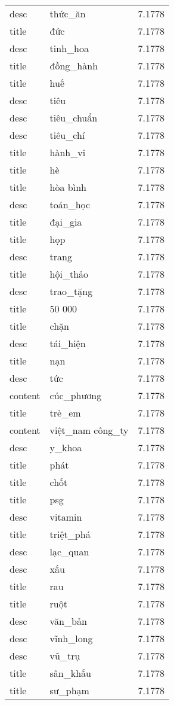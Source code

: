 \documentclass{article}
\begin{document}
\begin{tabular}{lll}
desc & thức\_ăn & 7.1778\\
title & đức & 7.1778\\
desc & tinh\_hoa & 7.1778\\
title & đồng\_hành & 7.1778\\
title & huế & 7.1778\\
desc & tiêu & 7.1778\\
desc & tiêu\_chuẩn & 7.1778\\
desc & tiêu\_chí & 7.1778\\
title & hành\_vi & 7.1778\\
title & hè & 7.1778\\
title & hòa bình & 7.1778\\
desc & toán\_học & 7.1778\\
title & đại\_gia & 7.1778\\
title & họp & 7.1778\\
desc & trang & 7.1778\\
title & hội\_thảo & 7.1778\\
desc & trao\_tặng & 7.1778\\
title & 50 000 & 7.1778\\
title & chặn & 7.1778\\
desc & tái\_hiện & 7.1778\\
title & nạn & 7.1778\\
desc & tức & 7.1778\\
content & cúc\_phương & 7.1778\\
title & trẻ\_em & 7.1778\\
content & việt\_nam công\_ty & 7.1778\\
desc & y\_khoa & 7.1778\\
title & phát & 7.1778\\
title & chốt & 7.1778\\
title & psg & 7.1778\\
desc & vitamin & 7.1778\\
title & triệt\_phá & 7.1778\\
desc & lạc\_quan & 7.1778\\
desc & xấu & 7.1778\\
title & rau & 7.1778\\
title & ruột & 7.1778\\
desc & văn\_bản & 7.1778\\
desc & vĩnh\_long & 7.1778\\
desc & vũ\_trụ & 7.1778\\
title & sân\_khấu & 7.1778\\
title & sư\_phạm & 7.1778\\

\end{tabular}
\end{document}
